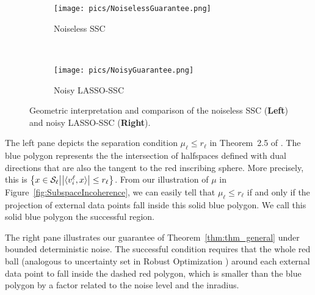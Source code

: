 \documentclass{ctexart}
\begin{document}
\begin{figure}
        \centering
        \begin{subfigure}[t]{0.4\textwidth}
          \centering
              \texttt{[image: pics/NoiselessGuarantee.png]}\\
               \caption{Noiseless SSC}
               \label{fig.noiseless_guarantee}
        \end{subfigure}%
        ~ %
        \begin{subfigure}[t]{0.4\textwidth}
              \centering
              \texttt{[image: pics/NoisyGuarantee.png]}\\
              \caption{Noisy LASSO-SSC} \label{fig.noisy_guarantee}
        \end{subfigure}
   \caption{Geometric interpretation and comparison of the noiseless SSC (\textbf{Left}) and noisy LASSO-SSC (\textbf{Right}).
   }
   \label{fig:geom_interpretation}
\end{figure}

The left pane depicts the separation condition $\mu_\ell \leq r_\ell$ in Theorem~2.5 of \cite{soltanolkotabi2011geometric}. The blue polygon represents the the intersection of halfspaces defined with dual directions that are also the tangent to the red inscribing sphere. More precisely, this is $\left\{x\in \mathcal{S}_\ell \middle| \big|\langle v_i^{\ell}, x\rangle\big| \leq r_\ell\right\}$. From our illustration of $\mu$ in Figure~\ref{fig:SubspaceIncoherence}, we can easily tell that $\mu_\ell\leq r_\ell$ if and only if the projection of external data points fall inside this solid blue polygon. We call this solid blue polygon the successful region.

The right pane illustrates our guarantee of Theorem~\ref{thm:thm_general} under bounded deterministic noise. The successful condition requires that the whole red ball (analogous to uncertainty set in Robust Optimization \cite{ben1998robust,bertsimas2004price}) around each external data point to fall inside the dashed red polygon, which is smaller than the blue polygon by a factor related to the noise level and the inradius.
\end{document}
